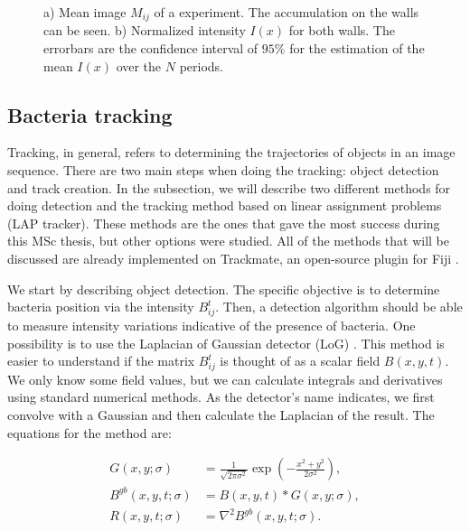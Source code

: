 \begin{figure}
	\centering
	
	\caption[Mean image and profile of an experiment]{a) Mean image $M_{ij}$ of a experiment. The accumulation on the walls can be seen. b) Normalized intensity $I(x)$ for both walls. The errorbars are the confidence interval of $95\%$ for the estimation of the mean $I(x)$ over the $N$ periods.}
	\label{mean_image_and_profile}
\end{figure}

\subsection{Bacteria tracking}

Tracking, in general, refers to determining the trajectories of objects in an image sequence. There are two main steps when doing the tracking: object detection and track creation. In the subsection, we will describe two different methods for doing detection and the tracking method based on linear assignment problems (LAP tracker). These methods are the ones that gave the most success during this MSc thesis, but other options were studied. All of the methods that will be discussed are already implemented on Trackmate, an open-source plugin for Fiji \cite{Tinevez2017TrackMate:Tracking}. 


We start by describing object detection. The specific objective is to determine bacteria position via the intensity $B_{ij}^t$. Then, a detection algorithm should be able to measure intensity variations indicative of the presence of bacteria. One possibility is to use the Laplacian of Gaussian detector (LoG) \cite{Kong2013AApplications,Sage2005AutomaticDynamics}. This method is easier to understand if the matrix $B_{ij}^t$ is thought of as a scalar field $B(x,y,t)$. We only know some field values, but we can calculate integrals and derivatives using standard numerical methods. As the detector's name indicates, we first convolve with a Gaussian and then calculate the Laplacian of the result. The equations for the method are:  

\begin{align}
	G(x,y;\sigma) &= \frac{1}{\sqrt{2\pi \sigma^2}} \exp\left(  -\frac{x^2+y^2}{2\sigma^2} \right), \\
	B^{gb}(x,y,t;\sigma) &= B(x,y,t) * G(x,y;\sigma), \\
	R(x,y,t;\sigma)  &= \nabla^2 B^{gb}(x,y,t;\sigma). \label{LoG:result}
\end{align}

